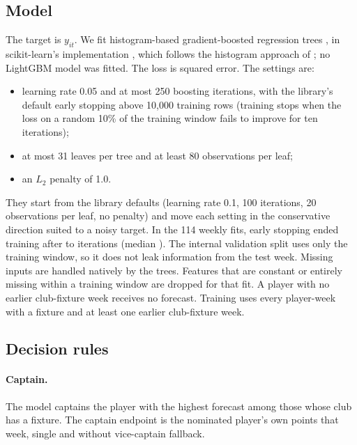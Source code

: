 \documentclass[11pt,a4paper]{article}
\begin{document}
\subsection{Model}
The target is $y_{it}$. We fit histogram-based gradient-boosted regression trees
\citep{friedman2001}, in scikit-learn's implementation \citep{pedregosa2011}, which follows the
histogram approach of \citet{ke2017}; no LightGBM model was fitted. The loss is squared error.
The settings are:
\begin{itemize}
  \item learning rate 0.05 and at most 250 boosting iterations, with the library's default early
        stopping above 10{,}000 training rows (training stops when the loss on a random 10\% of
        the training window fails to improve for ten iterations);
  \item at most 31 leaves per tree and at least 80 observations per leaf;
  \item an $L_2$ penalty of 1.0.
\end{itemize}
They start from the library defaults (learning rate 0.1, 100 iterations, 20 observations per leaf,
no penalty) and move each setting in the conservative direction suited to a noisy target. In the
114 weekly fits, early stopping ended training after \iterMin{} to \iterMax{} iterations (median
\iterMedian). The internal validation split uses only the training window, so it does not leak
information from the test week. Missing inputs are handled natively by the trees. Features that are
constant or entirely missing within a training window are dropped for that fit. A player with no
earlier club-fixture week receives no forecast. Training uses every player-week with a fixture and
at least one earlier club-fixture week.

\subsection{Decision rules}
\paragraph{Captain.} The model captains the player with the highest forecast among those whose
club has a fixture. The captain endpoint is the nominated player's own points that week, single
and without vice-captain fallback.
\end{document}
